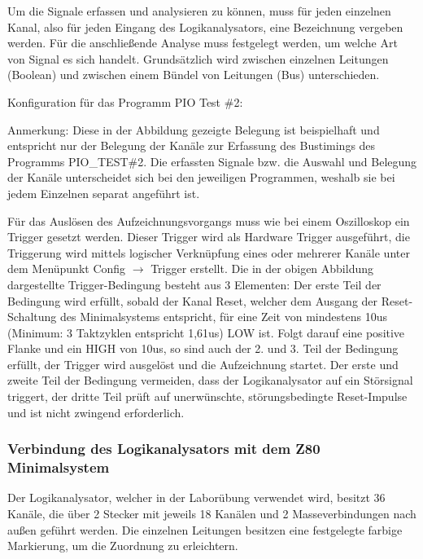 \label{sec:z80-digiview-kanal}
Um die Signale erfassen und analysieren zu können, muss für jeden einzelnen Kanal, also für jeden Eingang des Logikanalysators, eine Bezeichnung vergeben werden. Für die anschließende Analyse muss festgelegt werden, um welche Art von Signal es sich handelt. Grundsätzlich wird zwischen einzelnen Leitungen (Boolean) und zwischen einem Bündel von Leitungen (Bus) unterschieden.

Konfiguration für das Programm PIO Test \#2:
\begin{warning}
    Anmerkung: Diese in der Abbildung gezeigte Belegung ist beispielhaft und entspricht nur der Belegung der Kanäle zur Erfassung des Bustimings des Programms PIO\_TEST\#2. Die erfassten Signale bzw. die Auswahl und Belegung der Kanäle unterscheidet sich bei den jeweiligen Programmen, weshalb sie bei jedem Einzelnen separat angeführt ist.
\end{warning}

Für das Auslösen des Aufzeichnungsvorgangs muss wie bei einem Oszilloskop ein Trigger gesetzt werden. Dieser Trigger wird als Hardware Trigger ausgeführt, die Triggerung wird mittels logischer Verknüpfung eines oder mehrerer Kanäle unter dem Menüpunkt Config $\rightarrow$ Trigger erstellt.
Die in der obigen Abbildung dargestellte Trigger-Bedingung besteht aus 3 Elementen: Der erste Teil der Bedingung wird erfüllt, sobald der Kanal Reset, welcher dem Ausgang der Reset-Schaltung des Minimalsystems entspricht, für eine Zeit von mindestens 10us (Minimum: 3 Taktzyklen entspricht 1,61us) LOW ist. Folgt darauf eine positive Flanke und ein HIGH von 10us, so sind auch der 2. und 3. Teil der Bedingung erfüllt, der Trigger wird ausgelöst und die Aufzeichnung startet. Der erste und zweite Teil der Bedingung vermeiden, dass der Logikanalysator auf ein Störsignal triggert, der dritte Teil prüft auf unerwünschte, störungsbedingte Reset-Impulse und ist nicht zwingend erforderlich.

\subsubsection{Verbindung des Logikanalysators mit dem Z80 Minimalsystem}
Der Logikanalysator, welcher in der Laborübung verwendet wird, besitzt 36 Kanäle, die über 2 Stecker mit jeweils 18 Kanälen und 2 Masseverbindungen nach außen geführt werden. Die einzelnen Leitungen besitzen eine festgelegte farbige Markierung, um die Zuordnung zu erleichtern.

